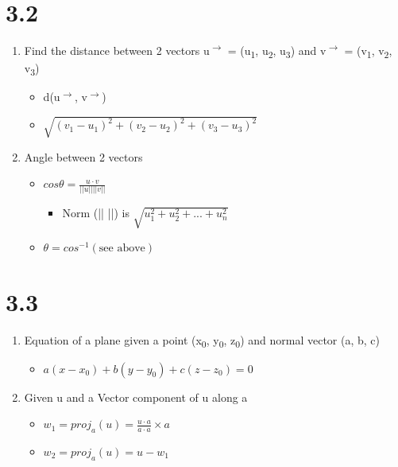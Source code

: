 \documentclass[letterpaper, 12pt]{article}
\begin{document}
\section{3.2}
\label{sec:org56a75c7}
\begin{enumerate}
\item Find the distance between 2 vectors u\textsuperscript{\(\rightarrow\)} = (u\textsubscript{1}, u\textsubscript{2}, u\textsubscript{3}) and v\textsuperscript{\(\rightarrow\)} = (v\textsubscript{1}, v\textsubscript{2}, v\textsubscript{3})\\
\begin{itemize}
\item d(u\textsuperscript{\(\rightarrow\)}, v\textsuperscript{\(\rightarrow\)})\\
\item \(\sqrt{(v_{1}-u_{1})^{2} + (v_{2}-u_{2})^{2} + (v_{3}-u_{3})^{2}}\)\\
\end{itemize}
\item Angle between 2 vectors\\
\begin{itemize}
\item \(cos\theta{} = \frac{u \cdot{} v}{||u||||v||}\)\\
\begin{itemize}
\item Norm (|| ||) is \(\sqrt{u_{1}^{2} + u_{2}^{2} + ... + u_{n}^{2}}\)\\
\end{itemize}
\item \(\theta{} = cos^{-1}( \text{see above} )\)\\
\end{itemize}
\end{enumerate}
\section{3.3}
\label{sec:org699511f}
\begin{enumerate}
\item Equation of a plane given a point (x\textsubscript{0}, y\textsubscript{0}, z\textsubscript{0}) and normal vector (a, b, c)\\
\begin{itemize}
\item \(a(x - x_{0}) + b(y - y_{0}) + c(z - z_{0}) = 0\)\\
\end{itemize}
\item Given u and a Vector component of u along a\\
\begin{itemize}
\item \(w_{1} = proj_{a}(u) = \frac{u \cdot{} a}{a \cdot{} a} \times{} a\)\\
\item \(w{_2} = proj_{a}(u) = u - w_{1}\)\\
\end{itemize}
\end{enumerate}
\end{document}
